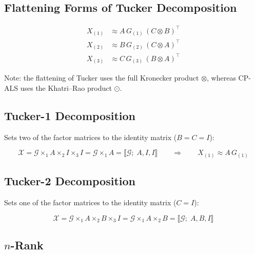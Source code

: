 \documentclass[12pt]{article}
\newcommand{\T}[1]{\mathcal{#1}}   %
\begin{document}
\subsection{Flattening Forms of Tucker Decomposition}

\begin{align}
X_{(1)} &\approx A\, G_{(1)}\,(C \otimes B)^{\top} \\[4pt]
X_{(2)} &\approx B\, G_{(2)}\,(C \otimes A)^{\top} \\[4pt]
X_{(3)} &\approx C\, G_{(3)}\,(B \otimes A)^{\top}
\end{align}

Note: the flattening of Tucker uses the full Kronecker product $\otimes$,
whereas CP-ALS uses the Khatri--Rao product $\odot$.

\subsection{Tucker-1 Decomposition}

Sets two of the factor matrices to the identity matrix ($B = C = I$):

\begin{equation}
\T{X} = \T{G} \times_1 A \times_2 I \times_3 I
= \T{G} \times_1 A
= \llbracket \T{G};\; A, I, I \rrbracket
\qquad\Rightarrow\qquad
X_{(1)} \approx A\, G_{(1)}
\end{equation}

\subsection{Tucker-2 Decomposition}

Sets one of the factor matrices to the identity matrix ($C = I$):

\begin{equation}
\T{X} = \T{G} \times_1 A \times_2 B \times_3 I
= \T{G} \times_1 A \times_2 B
= \llbracket \T{G};\; A, B, I \rrbracket
\end{equation}

\subsection{$n$-Rank}
\end{document}
